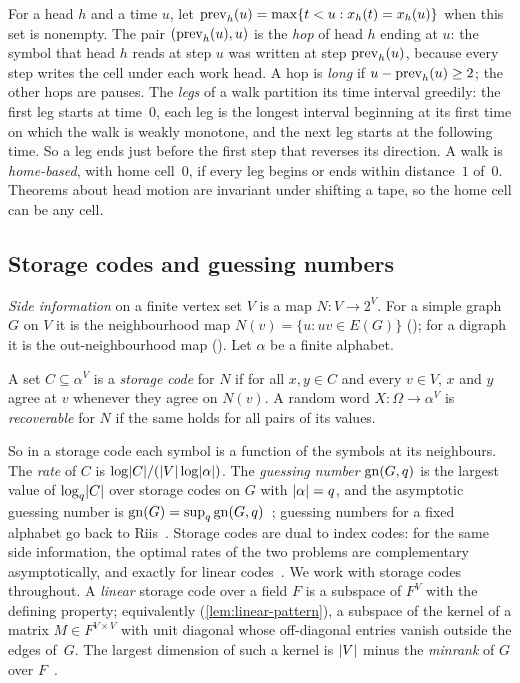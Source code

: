 For a head $h$ and a time $u$, let $\mathrm{prev}_h(u)=\max\{t<u : x_h(t)=x_h(u)\}$ when this set is nonempty. The pair
$(\mathrm{prev}_h(u),u)$ is the \emph{hop} of head $h$ ending at $u$: the symbol that head $h$ reads at step $u$ was written at
step $\mathrm{prev}_h(u)$, because every step writes the cell under each work head. A hop is \emph{long} if
$u-\mathrm{prev}_h(u)\ge2$; the other hops are pauses. The \emph{legs} of a walk partition its time interval greedily: the first
leg starts at time~$0$, each leg is the longest interval beginning at its first time on which the walk is weakly
monotone, and the next leg starts at the following time. So a leg ends just before the first step that reverses its direction.
A walk is \emph{home-based}, with home cell~$0$,
if every leg begins or ends within distance~$1$ of~$0$. Theorems about head motion are invariant under shifting a
tape, so the home cell can be any cell.

\subsection{Storage codes and guessing numbers}\label{sec:prelim-codes}

\emph{Side information} on a finite vertex set $V$ is a map $N\colon V\to 2^V$. For a simple graph $G$ on $V$ it is the
neighbourhood map $N(v)=\{u:uv\in E(G)\}$ (); for a digraph it is the out-neighbourhood map
(). Let $\alpha$ be a finite alphabet.

\begin{definition}\label{def:storage-code}
A set $C\subseteq\alpha^V$ is a \emph{storage code} for $N$ if for all $x,y\in C$ and every $v\in V$, $x$ and $y$ agree at
$v$ whenever they agree on $N(v)$. A random word $X\colon\Omega\to\alpha^V$ is \emph{recoverable} for $N$ if the same holds
for all pairs of its values.
\end{definition}

So in a storage code each symbol is a function of the symbols at its neighbours. The \emph{rate} of $C$ is
$\log\lvert C \rvert/(\lvert V \rvert\log\lvert \alpha \rvert)$. The \emph{guessing number} $\mathrm{gn}(G,q)$ is the largest value of
$\log_q\lvert C \rvert$ over storage codes on $G$ with $\lvert \alpha \rvert=q$, and the asymptotic guessing number is
$\mathrm{gn}(G)=\sup_q\mathrm{gn}(G,q)$~\cite[Def.~3.7 and Thm.~3.6]{ChristofidesMarkstrom2011}; guessing numbers for a fixed alphabet go
back to Riis~\cite{Riis2007}. Storage codes are dual to index codes: for the
same side information, the optimal rates of the two problems are complementary asymptotically, and exactly for linear
codes~\cite{Mazumdar2014,ArbabjolfaeiKim2015}.
We work with storage codes throughout.
A \emph{linear} storage code over a field $F$ is a subspace of $F^V$ with the defining property; equivalently
(\cref{lem:linear-pattern}), a subspace of the kernel of a matrix $M\in F^{V\times V}$ with unit diagonal whose off-diagonal
entries vanish outside the edges of~$G$. The largest dimension of such a kernel is $\lvert V \rvert$ minus the
\emph{minrank} of $G$ over $F$~\cite{Haemers1979,BBJK2011}.

